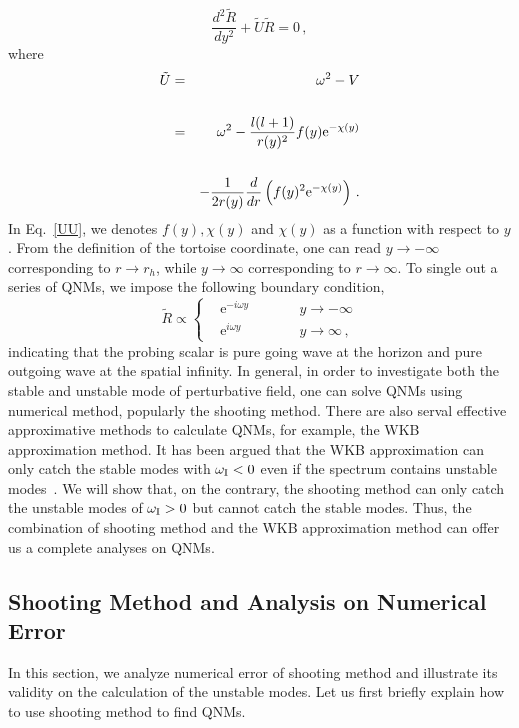\documentclass[pr, twocolumn, preprintnumbers, showpacs,footnoteadded, superscriptaddress,nofootinbib,longbibliography]{revtex4-1}
\newcommand{\te}{\mathrm{e}}
\begin{document}
\begin{equation}\label{derad}
\frac{d^2 \tilde{R}}{dy^2}+\tilde{U}\tilde{R}=0 \, ,
\end{equation}
%
where
%
\begin{eqnarray}\label{UU}
\tilde{U}&=&\omega^2-V \cr
~\cr
&=&\omega^2-\frac{l(l+1)}{r(y)^2}f(y) \te^{-\chi(y)} \cr
~ \cr
&&-\frac{1}{2r(y)}\frac{d}{dr}\left(f(y)^2 \te^{-\chi(y)}\right)\, .
\end{eqnarray}
%
In Eq.~\eqref{UU}, we denotes $f(y), \chi(y)$ and $\chi(y)$ as a function with respect to $y$. From the definition of the tortoise coordinate, one can read $y \to -\infty$ corresponding to $r \to r_h$, while $y \to \infty$ corresponding to $r \to \infty$. To single out a series of QNMs, we impose the following boundary condition,
%
\begin{equation}\label{wavebound}
\tilde{R} \varpropto \left\{
\begin{aligned}
&\te^{-i \omega y } \quad \quad  &&y \to -\infty \\
&\te^{i \omega y}   \quad \quad  &&y \to \infty \, ,
\end{aligned}
\right.
\end{equation}
%
indicating that the probing scalar is pure going wave at the horizon and pure outgoing wave at the spatial infinity. In general, in order to investigate both the stable and unstable mode of perturbative field, one can solve QNMs using numerical method, popularly the shooting method. There are also serval effective approximative methods to calculate QNMs, for example, the WKB approximation method. It has been argued that the WKB approximation can only catch the stable modes with $\omega_{\rm I}<0$ even if the spectrum contains unstable modes~\cite{Konoplya:2019hlu}.  We will show that, on the contrary, the shooting method can only catch the unstable modes of $\omega_{\rm I}>0$ but cannot catch the stable modes. Thus, the combination of shooting method and the WKB approximation method can offer us a complete analyses on QNMs.


\subsection{Shooting Method and Analysis on Numerical Error}\label{numerr}
In this section, we analyze numerical error of shooting method and illustrate its validity on the calculation of the unstable modes. Let us first briefly explain how to use shooting method to find QNMs.
\end{document}
